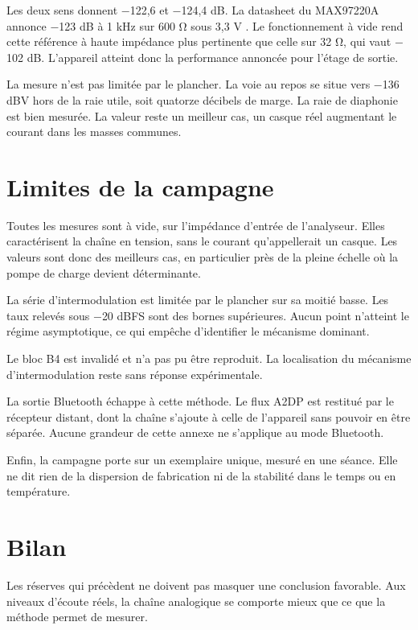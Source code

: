 Les deux sens donnent $-$122,6 et $-$124,4 dB. La datasheet du MAX97220A annonce $-$123 dB à 1 kHz sur 600 Ω sous 3,3 V \cite{analog_MAX97220A}. Le fonctionnement à vide rend cette référence à haute impédance plus pertinente que celle sur 32 Ω, qui vaut $-$102 dB. L'appareil atteint donc la performance annoncée pour l'étage de sortie.

La mesure n'est pas limitée par le plancher. La voie au repos se situe vers $-$136 dBV hors de la raie utile, soit quatorze décibels de marge. La raie de \gls{diaphonie} est bien mesurée. La valeur reste un meilleur cas, un casque réel augmentant le courant dans les masses communes.

\section{Limites de la campagne}
\label{ann:imd:limites}

Toutes les mesures sont à vide, sur l'impédance d'entrée de l'analyseur. Elles caractérisent la chaîne en tension, sans le courant qu'appellerait un casque. Les valeurs sont donc des meilleurs cas, en particulier près de la pleine échelle où la pompe de charge devient déterminante.

La série d'intermodulation est limitée par le plancher sur sa moitié basse. Les taux relevés sous $-$20 dBFS sont des bornes supérieures. Aucun point n'atteint le régime asymptotique, ce qui empêche d'identifier le mécanisme dominant.

Le bloc B4 est invalidé et n'a pas pu être reproduit. La localisation du mécanisme d'intermodulation reste sans réponse expérimentale.

La sortie Bluetooth échappe à cette méthode. Le flux A2DP est restitué par le récepteur distant, dont la chaîne s'ajoute à celle de l'appareil sans pouvoir en être séparée. Aucune grandeur de cette annexe ne s'applique au mode Bluetooth.

Enfin, la campagne porte sur un exemplaire unique, mesuré en une séance. Elle ne dit rien de la dispersion de fabrication ni de la stabilité dans le temps ou en température.

\section{Bilan}
\label{ann:imd:bilan}

Les réserves qui précèdent ne doivent pas masquer une conclusion favorable. Aux niveaux d'écoute réels, la chaîne analogique se comporte mieux que ce que la méthode permet de mesurer.

